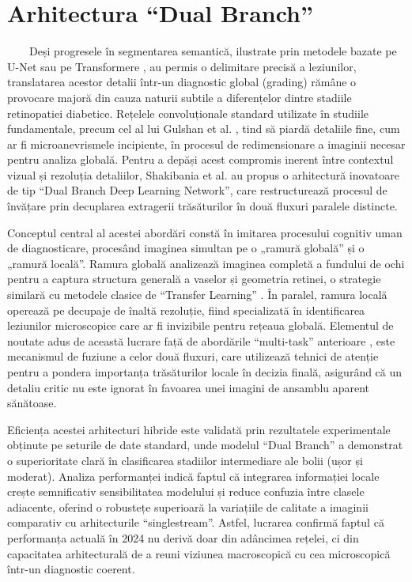 \documentclass[12pt, a4paper, twoside, romanian]{teza-upb}
\begin{document}
\section{Arhitectura “Dual Branch” \cite{11_shakibania2024dual}}

\ \ \ \ Deși progresele în segmentarea semantică, ilustrate prin metodele bazate pe U-Net \cite{12_sambyal2020modified}
sau pe
Transformere \cite{7_huang2022rtnet}, au permis o delimitare precisă a leziunilor, translatarea acestor detalii într-un
diagnostic global (grading) rămâne o provocare majoră din cauza naturii subtile a diferențelor dintre
stadiile retinopatiei diabetice. Rețelele convoluționale standard utilizate în studiile fundamentale,
precum cel al lui Gulshan et al. \cite{3_gulshan2016development}, tind să piardă detaliile
fine, cum ar fi microanevrismele incipiente, în
procesul de redimensionare a imaginii necesar pentru analiza globală. Pentru a depăși acest compromis
inerent între contextul vizual și rezoluția detaliilor, Shakibania et al. \cite{11_shakibania2024dual} au propus o arhitectură
inovatoare de tip “Dual Branch Deep Learning Network”, care restructurează procesul de învățare prin
decuplarea extragerii trăsăturilor în două fluxuri paralele distincte.

Conceptul central al acestei abordări constă în imitarea procesului cognitiv uman de
diagnosticare, procesând imaginea simultan pe o „ramură globală” și o „ramură locală”. Ramura globală
analizează imaginea completă a fundului de ochi pentru a captura structura generală a vaselor și
geometria retinei, o strategie similară cu metodele clasice de “Transfer Learning” \cite{10_jabbar2022transfer}. În paralel, ramura
locală operează pe decupaje de înaltă rezoluție, fiind specializată în identificarea leziunilor microscopice 
care ar fi invizibile pentru rețeaua globală. Elementul de noutate adus de această lucrare față de
abordările “multi-task” anterioare \cite{6_wang2021deep}, este mecanismul de fuziune a celor două fluxuri, care utilizează
tehnici de atenție pentru a pondera importanța trăsăturilor locale în decizia finală, asigurând că un
detaliu critic nu este ignorat în favoarea unei imagini de ansamblu aparent sănătoase.

Eficiența acestei arhitecturi hibride este validată prin rezultatele experimentale obținute pe
seturile de date standard, unde modelul “Dual Branch” a demonstrat o superioritate clară în clasificarea
stadiilor intermediare ale bolii (ușor și moderat). Analiza performanței indică faptul că integrarea
informației locale crește semnificativ sensibilitatea modelului și reduce confuzia între clasele adiacente,
oferind o robustețe superioară la variațiile de calitate a imaginii comparativ cu
arhitecturile “singlestream”. Astfel, lucrarea confirmă faptul că performanța actuală în 2024 nu
derivă doar din adâncimea
rețelei, ci din capacitatea arhitecturală de a reuni viziunea macroscopică cu cea microscopică într-un
diagnostic coerent.
\end{document}
